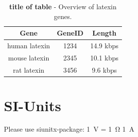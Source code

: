 \begin{table}[htp]
\centering
\begin{tabular}{ccc} %

{\bf Gene} & {\bf GeneID} & {\bf Length} \\
\hline %

human latexin & 1234 & 14.9 kbps \\
mouse latexin & 2345 & 10.1 kbps \\
rat latexin   & 3456 & 9.6 kbps \\

\end{tabular}
\caption[title of table]{\textbf{title of table} - Overview of latexin genes.}
\label{latexin_genes} %
\end{table}






\section{SI-Units}

Please use siunitx-package:
\SI{1}{\volt} = \SI{1}{\ohm} \SI{1}{\ampere}


